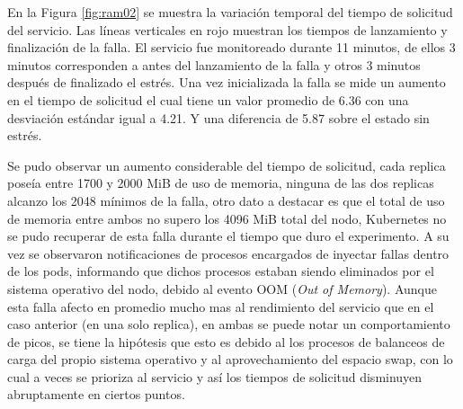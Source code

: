 \par En la Figura \ref{fig:ram02} se muestra la variación temporal del tiempo de solicitud del servicio. Las líneas verticales en rojo muestran los tiempos de lanzamiento y finalización de la falla. El servicio fue monitoreado durante 11 minutos, de ellos 3 minutos corresponden a antes del lanzamiento de la falla y otros 3 minutos después de finalizado el estrés. Una vez inicializada la falla se mide un aumento en el tiempo de solicitud el cual tiene un valor promedio de 6.36 con una desviación estándar igual a 4.21. Y una diferencia de 5.87 sobre el estado sin estrés.\\

\par Se pudo observar un aumento considerable del tiempo de solicitud, cada replica poseía entre 1700 y 2000 MiB de uso de memoria, ninguna de las dos replicas alcanzo los 2048 mínimos de la falla, otro dato a destacar es que el total de uso de memoria entre ambos no supero los 4096 MiB total del nodo, Kubernetes no se pudo recuperar de esta falla durante el tiempo que duro el experimento. A su vez se observaron notificaciones de procesos encargados de inyectar fallas dentro de los pods, informando que dichos procesos estaban siendo eliminados por el sistema operativo del nodo, debido al evento OOM (\textit{Out of Memory}). Aunque esta falla afecto en promedio mucho mas al rendimiento del servicio que en el caso anterior (en una solo replica), en ambas se puede notar un comportamiento de picos, se tiene la hipótesis que esto es debido al los procesos de balanceos de carga del propio sistema operativo y al aprovechamiento del espacio swap, con lo cual a veces se prioriza al servicio y así los tiempos de solicitud disminuyen abruptamente en ciertos puntos. \\

